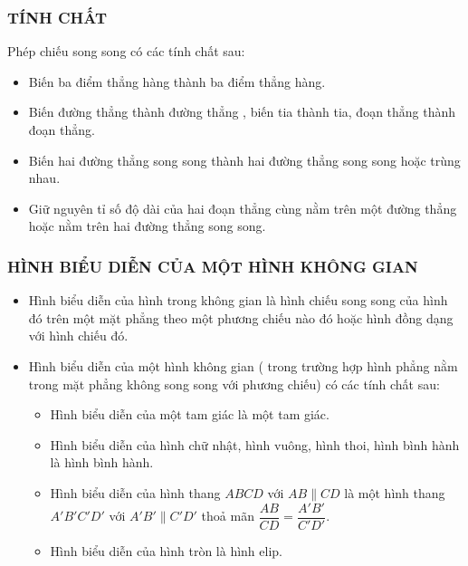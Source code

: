 \subsubsection{TÍNH CHẤT}
Phép chiếu song song có các tính chất sau:
\begin{itemize}
	\item[\ding{172}] Biến ba điểm thẳng hàng thành ba điểm thẳng hàng.
	\item[\ding{173}] Biến đường thẳng  thành đường thẳng , biến tia thành tia, đoạn thẳng thành đoạn thẳng.
	\item[\ding{174}] Biến hai đường thẳng song song thành hai đường thẳng song song  hoặc trùng nhau.
	\item[\ding{175}] Giữ nguyên tỉ số độ dài của hai đoạn thẳng cùng nằm trên một đường thẳng hoặc nằm trên hai đường thẳng song song.
\end{itemize}

\subsubsection{HÌNH BIỂU DIỄN CỦA MỘT HÌNH KHÔNG GIAN}
\begin{itemize}
	\item[\ding{172}] Hình biểu diễn của hình trong không gian là hình chiếu song song của hình đó trên một mặt phẳng theo một phương chiếu nào đó hoặc hình đồng dạng với hình chiếu đó.
	\item[\ding{173}] Hình biểu diễn của một hình không gian ( trong trường hợp hình phẳng nằm trong mặt phẳng không song song với phương chiếu) có các tính chất sau:
		\begin{itemize}
			\item Hình biểu diễn của một tam giác là một tam giác.
			\item Hình biểu diễn của hình chữ nhật, hình vuông, hình thoi, hình bình hành là hình bình hành.
			\item Hình biểu diễn của hình thang $ABCD$ với $AB\parallel CD$ là một hình thang $A'B'C'D'$ với $A'B'\parallel C'D'$ thoả mãn $\dfrac{AB}{CD}=\dfrac{A'B'}{C'D'}$.
			\item Hình biểu diễn của hình tròn là hình elip.
		\end{itemize}
\end{itemize}
